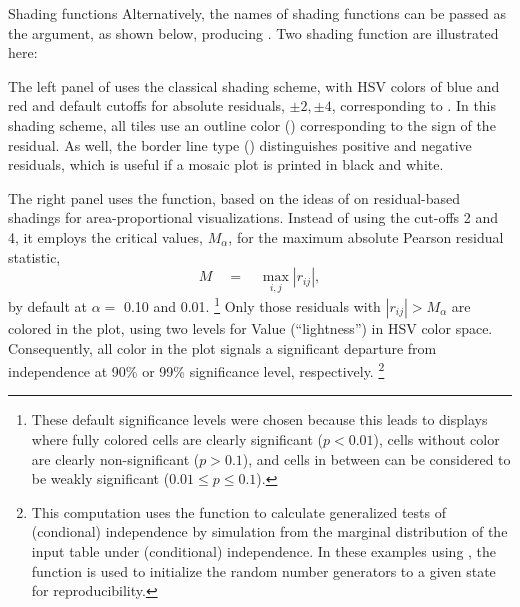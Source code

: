 \documentclass[11pt]{book}\usepackage[]{graphicx}\usepackage[]{color}
\begin{document}
\begin{Example}[shading]{Shading functions}
Alternatively, the names of shading functions can be passed as the  argument,
as shown below, producing .   Two shading function are illustrated
here:
\begin{itemize*}
  \item The left panel of  uses the classical \citet{Friendly:94a}
  shading scheme,  with HSV colors of blue and red and
  default cutoffs for absolute residuals, $\pm 2, \pm 4$,
  corresponding to .  In this shading scheme,
  all tiles use an outline color () corresponding to the sign of the residual.
  As well, the border line type () distinguishes positive and negative residuals,
  which is useful if a mosaic plot is printed in black and white.

\item The right panel uses the  function, based on the ideas of
   \citet{Zeileis-etal:2007} on residual-based shadings for area-proportional
   visualizations.
   Instead of using the cut-offs 2 and 4, it employs the critical values, $M_\alpha$,
   for the maximum 
   absolute Pearson residual statistic, 
\begin{equation*} \label{eq:MaxAbs}
M \quad = \quad \max_{i, j} |r_{ij}| \comma
\end{equation*}
by default at $\alpha =$ 0.10 and 0.01.%
\footnote{
These default significance levels were chosen because this
leads to displays where fully colored cells are clearly significant ($p < 0.01$),
cells without color are clearly non-significant ($p > 0.1$), and
cells in between can be considered to be weakly significant ($0.01 \le p \le 0.1$).
}
   Only those residuals with $| r_{ij} | >  M_\alpha$ are colored in the plot,
   using two levels for Value (``lightness'') in HSV color space.
   Consequently, all
   color in the plot signals a significant departure from independence 
   at 90\% or 99\% significance level, respectively.%
\footnote{
This computation uses the  function 
to calculate generalized tests of (condional) independence
by simulation from the marginal distribution of the input table under (conditional) independence.
In these examples using , the function  is used to
initialize the random number generators to a given state for reproducibility.
}
\end{itemize*}


\end{Example}
\end{document}
